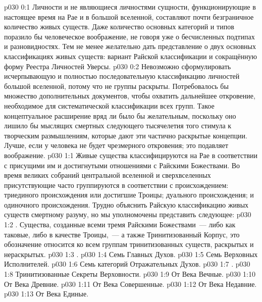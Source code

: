 \author{Могущественный Посланник}
\vs p030 0:1 Личности и не являющиеся личностями сущности, функционирующие в настоящее время на Рае и в большой вселенной, составляют почти безграничное количество живых существ. Даже количество основных категорий и типов поразило бы человеческое воображение, не говоря уже о бесчисленных подтипах и разновидностях. Тем не менее желательно дать представление о двух основных классификациях живых существ: вариант Райской классификации и сокращённую форму Реестра Личностей Уверсы.
\vs p030 0:2 Невозможно сформулировать исчерпывающую и полностью последовательную классификацию личностей большой вселенной, потому что не  группы раскрыты. Потребовалось бы множество дополнительных документов, чтобы охватить дальнейшее откровение, необходимое для систематической классификации всех групп. Такое концептуальное расширение вряд ли было бы желательным, поскольку оно лишило бы мыслящих смертных следующего тысячелетия того стимула к творческим размышлениям, которые дают эти частично раскрытые концепции. Лучше, если у человека не будет чрезмерного откровения; это подавляет воображение.
\vs p030 1:1 Живые существа классифицируются на Рае в соответствии с присущими им и достигнутыми отношениями с Райскими Божествами. Во время великих собраний центральной вселенной  и сверхвселенных присутствующие часто группируются в соответствии с происхождением: триединого происхождения или достигшие Троицы; дуального происхождения; и одиночного происхождения. Трудно объяснить Райскую классификацию живых существ смертному разуму, но мы уполномочены представить следующее:
\vs p030 1:2 . Существа, созданные всеми тремя Райскими Божествами~--- либо как таковые, либо в качестве Троицы,~--- а также Тринитизованный Корпус, это обозначение относится ко всем группам тринитизованных существ, раскрытых и нераскрытых.
\vs p030 1:3 .
\vs p030 1:4 Семь Главных Духов.
\vs p030 1:5 Семь Верховных Исполнителей.
\vs p030 1:6 Семь категорий Отражательных Духов.
\vs p030 1:7 .
\vs p030 1:8 Тринитизованные Секреты Верховности.
\vs p030 1:9 От Века Вечные.
\vs p030 1:10 От Века Древние.
\vs p030 1:11 От Века Совершенные.
\vs p030 1:12 От Века Недавние.
\vs p030 1:13 От Века Единые.

